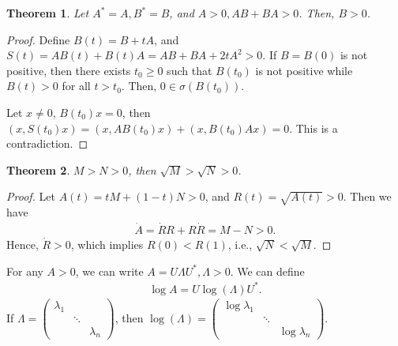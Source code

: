 \documentclass[10pt]{book}
\newtheorem{theorem}{Theorem}[chapter]
\theoremstyle{definition}
\numberwithin{equation}{chapter}
\begin{document}
\begin{theorem}
Let $A^* = A, B^* = B$, and $A > 0, AB + BA > 0$. Then, $B > 0$.
\end{theorem}
\begin{proof}
Define $B(t) = B + tA$, and $S(t) = AB(t) + B(t)A = AB + BA + 2t A^2 > 0$. If $B = B(0)$ is not positive, then there exists $t_0 \geq 0$ such that $B(t_0)$ is not positive while $B(t) > 0$ for all $t > t_0$. Then, $0 \in \sigma(B(t_0))$. 

Let $x \neq 0$, $B(t_0)x = 0$, then $(x, S(t_0)x) = (x, AB(t_0)x) + (x, B(t_0)Ax) = 0$. This is a contradiction.
\end{proof}

\medskip

\begin{theorem}
$M > N > 0$, then $\sqrt{M} > \sqrt{N} > 0$.
\end{theorem}
\begin{proof}
Let $A(t) = tM + (1-t)N > 0$, and $R(t) = \sqrt{A(t)} > 0$. Then we have 
\begin{align*}
    \dot{A} = \dot{R}R + R \dot{R} = M - N > 0.
\end{align*}
Hence, $\dot{R} > 0$, which implies $R(0) < R(1)$, i.e., $\sqrt{N} < \sqrt{M}$.
\end{proof}

\medskip

For any $A > 0$, we can write $A = U \Lambda U^*, \Lambda > 0$. We can define 
\begin{align*}
    \log A = U \log (\Lambda) U^*.
\end{align*}
If $\Lambda = \begin{pmatrix}
\lambda_1 &  &  \\
& \ddots &  \\
&  & \lambda_n
\end{pmatrix}$, then $\log (\Lambda) = \begin{pmatrix}
 \log \lambda_1 &  &  \\
& \ddots &  \\
&  & \log \lambda_n
\end{pmatrix}$.

\medskip
\end{document}
